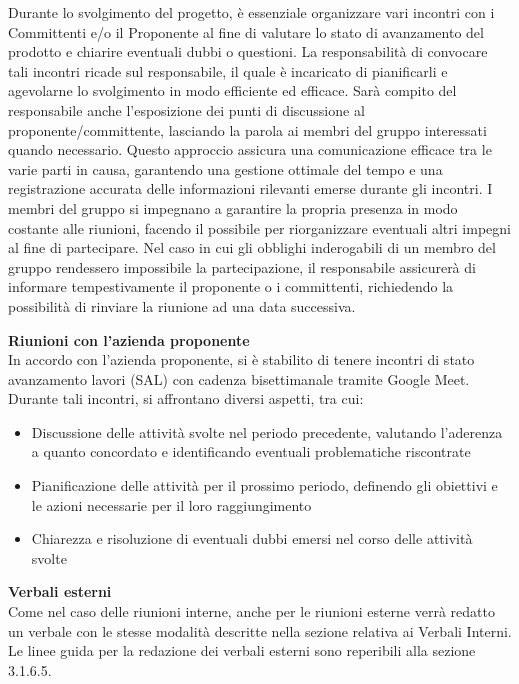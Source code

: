 Durante lo svolgimento del progetto, è essenziale organizzare vari incontri con i Committenti e/o il Proponente al fine di valutare lo stato di avanzamento del prodotto e chiarire eventuali dubbi o questioni.
La responsabilità di convocare tali incontri ricade sul responsabile, il quale è incaricato di pianificarli e agevolarne lo svolgimento in modo efficiente ed efficace.
Sarà compito del responsabile anche l’esposizione dei punti di discussione al proponente/committente, lasciando la parola ai membri del gruppo interessati quando necessario. Questo approccio assicura una comunicazione efficace tra le varie parti in causa, garantendo una gestione ottimale del tempo e una registrazione accurata delle informazioni rilevanti emerse durante gli incontri.
I membri del gruppo si impegnano a garantire la propria presenza in modo costante alle riunioni, facendo il possibile per riorganizzare eventuali altri impegni al fine di partecipare. Nel caso in cui gli obblighi inderogabili di un membro del gruppo rendessero impossibile la partecipazione, il responsabile assicurerà di informare tempestivamente il proponente o i committenti, richiedendo la possibilità di rinviare la riunione ad una data successiva.

\textbf{Riunioni con l'azienda proponente}\\
In accordo con l’azienda proponente, si è stabilito di tenere incontri di stato avanzamento lavori (SAL) con cadenza bisettimanale tramite Google Meet.
Durante tali incontri, si affrontano diversi aspetti, tra cui:
\begin{itemize}
    \item Discussione delle attività svolte nel periodo precedente, valutando l’aderenza a quanto concordato e identificando eventuali problematiche riscontrate
    \item Pianificazione delle attività per il prossimo periodo, definendo gli obiettivi e le azioni necessarie per il loro raggiungimento
    \item Chiarezza e risoluzione di eventuali dubbi emersi nel corso delle attività svolte
\end{itemize}

\textbf{Verbali esterni}\\
Come nel caso delle riunioni interne, anche per le riunioni esterne verrà redatto un verbale con le stesse modalità descritte nella sezione relativa ai Verbali Interni.
Le linee guida per la redazione dei verbali esterni sono reperibili alla sezione 3.1.6.5.


